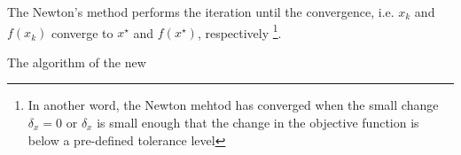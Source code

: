 The Newton's method performs the iteration until the convergence, i.e. $x_k$ and $f(x_k)$ converge to $x^\star$ and $f(x^\star)$, respectively \footnote{In another word, the Newton mehtod has converged when the small change $\delta_x =0$ or $\delta_x$ is small enough that the change in the objective function is below a pre-defined tolerance level}.   

The algorithm of the new 































